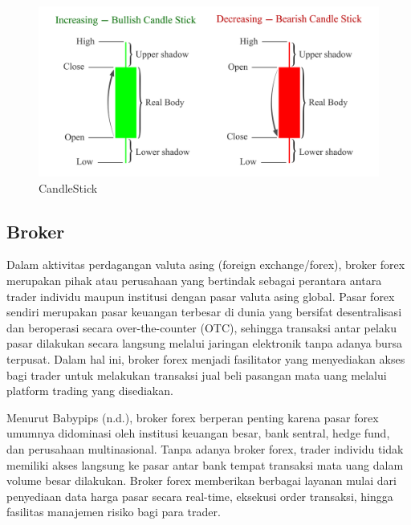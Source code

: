 \begin{figure} [H] \centering
    \includegraphics[scale=1.4]{gambar/candlestick.png} 
    \caption{CandleStick}
    \label{fig:label_gambar}
\end{figure}

\subsection{Broker}
Dalam aktivitas perdagangan valuta asing (foreign exchange/forex), broker forex merupakan pihak atau perusahaan yang bertindak sebagai perantara antara trader individu maupun institusi dengan pasar valuta asing global. Pasar forex sendiri merupakan pasar keuangan terbesar di dunia yang bersifat desentralisasi dan beroperasi secara over-the-counter (OTC), sehingga transaksi antar pelaku pasar dilakukan secara langsung melalui jaringan elektronik tanpa adanya bursa terpusat. Dalam hal ini, broker forex menjadi fasilitator yang menyediakan akses bagi trader untuk melakukan transaksi jual beli pasangan mata uang melalui platform trading yang disediakan.

Menurut Babypips (n.d.), broker forex berperan penting karena pasar forex umumnya didominasi oleh institusi keuangan besar, bank sentral, hedge fund, dan perusahaan multinasional. Tanpa adanya broker forex, trader individu tidak memiliki akses langsung ke pasar antar bank tempat transaksi mata uang dalam volume besar dilakukan. Broker forex memberikan berbagai layanan mulai dari penyediaan data harga pasar secara real-time, eksekusi order transaksi, hingga fasilitas manajemen risiko bagi para trader.

